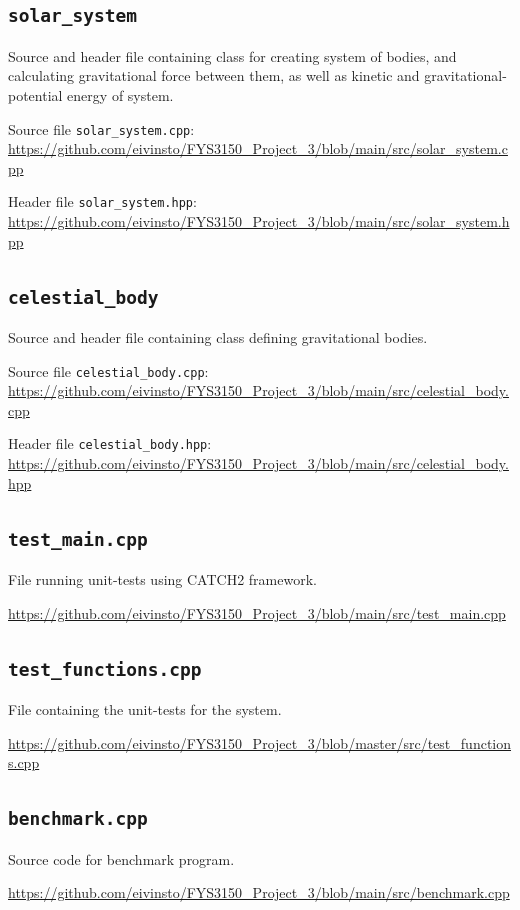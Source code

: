 \documentclass[reprint,english,notitlepage]{revtex4-1}  %
\begin{document}
\cprotect\subsection{\verb+solar_system+} \label{A.4}
Source and header file containing class for creating system of bodies, and calculating gravitational force between them, as well as kinetic and gravitational-potential energy of system.

Source file \verb+solar_system.cpp+:
\url{https://github.com/eivinsto/FYS3150_Project_3/blob/main/src/solar_system.cpp}

Header file \verb+solar_system.hpp+:
\url{https://github.com/eivinsto/FYS3150_Project_3/blob/main/src/solar_system.hpp}

\cprotect\subsection{\verb+celestial_body+} \label{A.5}
Source and header file containing class defining gravitational bodies.

Source file \verb+celestial_body.cpp+:
\url{https://github.com/eivinsto/FYS3150_Project_3/blob/main/src/celestial_body.cpp}

Header file \verb+celestial_body.hpp+:
\url{https://github.com/eivinsto/FYS3150_Project_3/blob/main/src/celestial_body.hpp}

\cprotect\subsection{\verb+test_main.cpp+} \label{A.6}
File running unit-tests using CATCH2 framework.

\url{https://github.com/eivinsto/FYS3150_Project_3/blob/main/src/test_main.cpp}

\cprotect\subsection{\verb+test_functions.cpp+} \label{A.7}
File containing the unit-tests for the system.

\url{https://github.com/eivinsto/FYS3150_Project_3/blob/master/src/test_functions.cpp}

\cprotect\subsection{\verb+benchmark.cpp+} \label{A.8}
Source code for benchmark program.

\url{https://github.com/eivinsto/FYS3150_Project_3/blob/main/src/benchmark.cpp}
\end{document}
